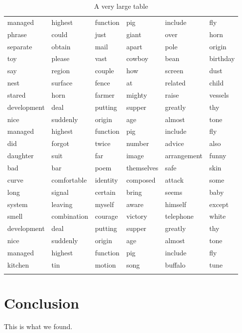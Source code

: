 \documentclass{jcls}
\begin{document}
\begin{longtable}{@{}llllll@{}}
	managed     & highest     & function & pig        & include     & fly       \\
	phrase      & could       & just     & giant      & over        & horn      \\
	separate    & obtain      & mail     & apart      & pole        & origin    \\
	toy         & please      & vast     & cowboy     & bean        & birthday  \\
	say         & region      & couple   & how        & screen      & dust      \\
	nest        & surface     & fence    & at         & related     & child     \\
	stared      & horn        & farmer   & mighty     & raise       & vessels   \\
	development & deal        & putting  & supper     & greatly     & thy       \\
	nice        & suddenly    & origin   & age        & almost      & tone      \\
	managed     & highest     & function & pig        & include     & fly       \\
	did         & forgot      & twice    & number     & advice      & also      \\
	daughter    & suit        & far      & image      & arrangement & funny     \\
	bad         & bar         & poem     & themselves & safe        & skin      \\
	curve       & comfortable & identity & composed   & attack      & some      \\
	long        & signal      & certain  & bring      & seems       & baby      \\
	system      & leaving     & myself   & aware      & himself     & except    \\
	smell       & combination & courage  & victory    & telephone   & white     \\
	development & deal        & putting  & supper     & greatly     & thy       \\
	nice        & suddenly    & origin   & age        & almost      & tone      \\
	managed     & highest     & function & pig        & include     & fly       \\
	kitchen     & tin         & motion   & song       & buffalo     & tune      \\* \bottomrule
	\caption{A very large table}
\end{longtable}

\section{Conclusion}

This is what we found.

%
%
%
\end{document}
